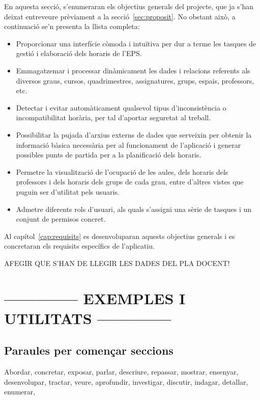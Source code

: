 \documentclass[a4paper,12pt]{ThesisStyle}
\begin{document}
En aquesta secció, s'enumeraran els objectius generals del projecte, que ja s'han deixat entreveure prèviament a la secció~\ref{sec:proposit}. No obstant això, a continuació se'n presenta la llista completa:
\begin{itemize}
  \item Proporcionar una interfície còmoda i intuïtiva per dur a terme les tasques de gestió i elaboració dels horaris de l'EPS.
  \item Emmagatzemar i processar dinàmicament les dades i relacions referents als diversos graus, cursos, quadrimestres, assignatures, grups, espais, professors, etc.
  \item Detectar i evitar automàticament qualsevol tipus d'inconsistència o incompatibilitat horària, per tal d'aportar seguretat al treball.
  \item Possibilitar la pujada d'arxius externs de dades que serveixin per obtenir la informació bàsica necessària per al funcionament de l'aplicació i generar possibles punts de partida per a la planificació dels horaris.
  \item Permetre la visualització de l'ocupació de les aules, dels horaris dels professors i dels horaris dels grups de cada grau, entre d'altres vistes que puguin ser d'utilitat pels usuaris.
  \item Admetre diferents rols d'usuari, als quals s'assigni una sèrie de tasques i un conjunt de permisos concret.
\end{itemize}

Al capítol~\ref{cap:requisits} es desenvoluparan aquests objectius generals i es concretaran els requisits específics de l'aplicatiu.

AFEGIR QUE S'HAN DE LLEGIR LES DADES DEL PLA DOCENT!


\section{-------------- EXEMPLES I UTILITATS --------------}
\subsection{Paraules per començar seccions}

Abordar, concretar, exposar, parlar, descriure, repassar, mostrar, ensenyar, desenvolupar, tractar, veure, aprofundir, investigar, discutir, indagar, detallar, enumerar,
\end{document}
